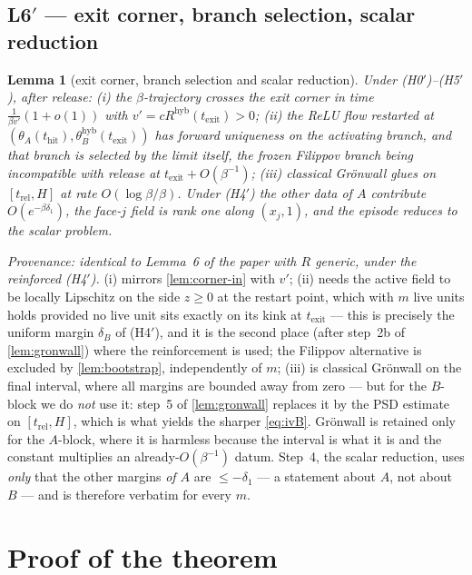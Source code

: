 \documentclass[11pt]{article}
\newtheorem{lemma}{Lemma}
\theoremstyle{definition}
\theoremstyle{remark}
\newcommand{\hyb}{\mathrm{hyb}}
\newcommand{\thit}{t_{\mathrm{hit}}}
\newcommand{\texit}{t_{\mathrm{exit}}}
\newcommand{\trel}{t_{\mathrm{rel}}}
\begin{document}
\subsection*{L6$'$ --- exit corner, branch selection, scalar reduction}

\begin{lemma}[exit corner, branch selection and scalar reduction]\label{lem:corner-out}
Under \textup{(H0$'$)--(H5$'$)}, after release: (i) the $\beta$-trajectory
crosses the exit corner in time $\tfrac{1}{\beta v'}(1+o(1))$ with
$v'=cR^{\hyb}(\texit)>0$; (ii) the ReLU flow restarted at
$(\theta_A(\thit),\theta_B^{\hyb}(\texit))$ has forward uniqueness on the
activating branch, and that branch is selected by the limit itself, the frozen
Filippov branch being incompatible with release at $\texit+O(\beta^{-1})$;
(iii) classical Gr\"onwall glues on $[\trel,H]$ at rate $O(\log\beta/\beta)$.
Under (H4$'$) the other data of $A$ contribute $O(e^{-\beta\delta_1})$, the
face-$j$ field is rank one along $(x_j,1)$, and the episode reduces to the scalar
problem.
\end{lemma}

\noindent\emph{Provenance: identical to Lemma~6 of the paper with $R$ generic,
under the reinforced (H4$'$).} (i) mirrors \cref{lem:corner-in} with $v'$;
(ii) needs the active field to be locally Lipschitz on the side $z\ge0$ at the
restart point, which with $m$ live units holds provided no live unit sits exactly
on its kink at $\texit$ --- this is precisely the uniform margin $\delta_B$ of
(H4$'$), and it is the second place (after step~2b of \cref{lem:gronwall}) where
the reinforcement is used; the Filippov alternative is excluded by
\cref{lem:bootstrap}, independently of $m$; (iii) is classical Gr\"onwall on the
final interval, where all margins are bounded away from zero --- but for the
$B$-block we do \emph{not} use it: step~5 of \cref{lem:gronwall} replaces it by
the PSD estimate on $[\trel,H]$, which is what yields the sharper
\eqref{eq:ivB}. Gr\"onwall is retained only for the $A$-block, where it is
harmless because the interval is what it is and the constant multiplies an
already-$O(\beta^{-1})$ datum. Step~4, the scalar
reduction, uses \emph{only} that the other margins \emph{of $A$} are
$\le-\delta_1$ --- a statement about $A$, not about $B$ --- and is therefore
verbatim for every $m$.

\section{Proof of the theorem}\label{sec:proof}
\end{document}
